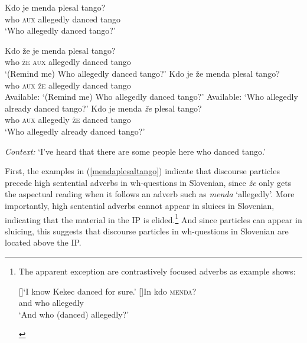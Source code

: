 \documentclass[output=paper,
modfonts,
newtxmath,
hidelinks
]{langscibook}
\begin{document}
\begin{exe}
\ex \gll Kdo je menda plesal tango?\\
         who \textsc{aux} allegedly danced tango\\
 \trans `Who allegedly danced tango?'
\ex \label{mendaplesaltango}
\begin{xlist}
 \ex \gll	Kdo že je menda plesal tango?\\
 who \textsc{že} \textsc{aux} allegedly danced tango\\
\trans `(Remind me) Who allegedly danced tango?'
\ex \gll	Kdo je že menda plesal tango?\\
 who \textsc{aux} \textsc{že}  allegedly danced tango\\
 \glt Available: `(Remind me) Who allegedly danced tango?'
 \glt Available: `Who allegedly already danced tango?'
\ex \gll	Kdo je menda \textit{že} plesal tango?\\
 who \textsc{aux} allegedly \textsc{že} danced tango\\
\trans `Who allegedly already danced tango?'
\end{xlist}
\ex \textit{Context:} `I've heard that there are some people here who danced tango.'
\begin{xlist}
\end{xlist}
\end{exe}

\noindent First, the examples in (\ref{mendaplesaltango}) indicate that discourse particles precede high sentential adverbs in wh-questions in Slovenian, since \textit{že} only gets the aspectual reading when it follows an adverb such as \textit{menda} `allegedly'. More importantly, high sentential adverbs cannot appear in sluices in Slovenian, indicating that the material in the IP is elided.\footnote{The apparent exception are contrastively focused adverbs as example  shows:

\ea \label{fn16exi}
\begin{xlist}
[]{`I know Kekec danced for sure.'}
[]{\gll In kdo \textsc{menda}?\\
and who allegedly\\
\glt `And who (danced) allegedly?'}
\end{xlist}
\zlast} And since particles can appear in sluicing, this suggests that discourse particles in wh-questions in Slovenian are located above the IP.
\end{document}
